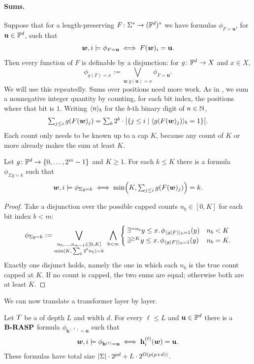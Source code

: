\paragraph{Sums.}
Suppose that for a length-preserving $F\colon{{ \Sigma}}^*\to(\mathbb{F}^d)^*$ we have formulas
$\phi_{F=\mathbf{u}}$, for $\mathbf{u}\in\mathbb{F}^d$, such that
\[
{{\boldsymbol{w}}},i\models\phi_{F=\mathbf{u}} \iff F({{\boldsymbol{w}}})_i=\mathbf{u}.
\]
Then every function of $F$ is definable by a disjunction: for $g\colon\mathbb{F}^d\to X$ and $x\in X$,
\begin{equation}
\phi_{g(F)=x} := \bigvee_{\mathbf{u}\colon g(\mathbf{u})=x}\phi_{F=\mathbf{u}}.
\label{eq:pointwise}
\end{equation}
We will use this repeatedly. Sums over positions need more work. As in
\citet{yang-etal-2025-knee}, we sum a nonnegative integer quantity by counting, for each bit index,
the positions where that bit is $1$.
Writing $\langle n\rangle_{b}$ for the $b$-th binary digit of $n\in{{ \mathbb{N}}}$,
\[
\textstyle\sum_{j\leq i} g(F({{\boldsymbol{w}}})_j) = \sum_b 2^b\cdot\bigl|\{j\leq i\mid \langle g(F({{\boldsymbol{w}}})_j)\rangle_{b}=1\}\bigr|.
\]
Each count only needs to be known up to a cap $K$, because any count of $K$ or more
already makes the sum at least $K$.

\begin{lemma} \label{lem:sums}
Let $g\colon\mathbb{F}^d\to\{0,\ldots,2^m-1\}$ and $K\geq1$. For each $k\leq K$ there is a formula
$\phi_{\Sigma g=k}$ such that
\[
{{\boldsymbol{w}}},i\models\phi_{\Sigma g=k}\iff \min\Bigl(K,\textstyle\sum_{j\leq i}g(F({{\boldsymbol{w}}})_j)\Bigr)=k.
\]
\end{lemma}

\begin{proof}
Take a disjunction over the possible capped counts $n_b\in[0,K]$ for each bit index $b<m$:
\[
\phi_{\Sigma g=k} := \bigvee_{\substack{n_0,\ldots,n_{m-1}\in[0,K]\\ \min(K,\,\sum_b 2^b n_b)=k}}\ \bigwedge_{b<m}
\begin{cases}
\exists^{= n_b} y\leq x.\, \phi_{\langle g(F)\rangle_{b}=1}(y) & n_b<K\\
\exists^{\geq K} y\leq x.\, \phi_{\langle g(F)\rangle_{b}=1}(y) & n_b=K.
\end{cases}
\]
Exactly one disjunct holds, namely the one in which each $n_b$ is the true count capped at $K$.
If no count is capped, the two sums are equal; otherwise both are at least $K$.
\end{proof}

We can now translate a transformer layer by layer.

\begin{theorem} \label{thm:transformer_to_brasp}
Let ${T}$ be a \frtfr{} of depth $L$ and width $d$. For every $\ell\leq L$ and $\mathbf{u}\in\mathbb{F}^d$
there is a ${\textbf{B-RASP}}$ formula $\phi_{\mathbf{h}^{(\ell)}=\mathbf{u}}$ such that
\begin{equation}
{{\boldsymbol{w}}},i\models\phi_{\mathbf{h}^{(\ell)}=\mathbf{u}} \iff \mathbf{h}^{(\ell)}_i({{\boldsymbol{w}}})=\mathbf{u}.
\label{eq:simulates}
\end{equation}
These formulas have total size $|{{ \Sigma}}|\cdot2^{{p} d}+L\cdot2^{O({p}({p}+d))}$.
\end{theorem}

